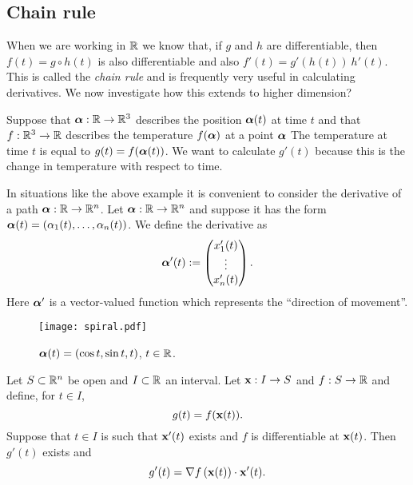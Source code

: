 \subsection*{Chain rule}

When we are working in \(\mathbb{R}\) we know that, if \(g\) and \(h\) are differentiable, then \(f(t) = g\circ h(t)\) is also differentiable and also \(f'(t) = g'(h(t)) \ h'(t)\).
This is called the \emph{chain rule} and is frequently very useful in calculating derivatives.
We now investigate how this extends to higher dimension?

\begin{example*}
    Suppose that
    \(\boldsymbol{\alpha}:\mathbb{R} \to \mathbb{R}^3\) describes the position \(\boldsymbol{\alpha}(t)\) at time \(t\)
    and that
    \(f:\mathbb{R}^3 \to \mathbb{R}\) describes the temperature \(f(\boldsymbol{\alpha})\) at a point \(\boldsymbol{\alpha}\)
    The temperature at time \(t\) is equal to \(g(t)=f(\boldsymbol{\alpha}(t))\).
    We want to calculate \(g'(t)\) because this is the change in temperature with respect to time.
\end{example*}

In situations like the above example it is convenient to consider the derivative of a path \(\boldsymbol{\alpha}:\mathbb{R} \to \mathbb{R}^n\).
Let \(\boldsymbol{\alpha}:\mathbb{R} \to \mathbb{R}^n\) and suppose it has the form
\(\boldsymbol{\alpha}(t) = \left( \alpha_1(t), \ldots, \alpha_n(t)  \right)\).
We define the derivative as
\[
    \boldsymbol{\alpha}'(t) := \begin{pmatrix}
        x_1'(t) \\
        \vdots  \\
        x_n'(t)
    \end{pmatrix}.
\]
\noindent
Here \(\boldsymbol{\alpha}'\) is a vector-valued function which represents the ``direction of movement''.

\begin{figure}[htb]
    \begin{center}
        \texttt{[image: spiral.pdf]}
        \caption{\(\boldsymbol{\alpha}(t)=(\cos t, \sin t, t)\), \(t\in \mathbb{R}\).}%
        \label{fig:spiral}
    \end{center}
\end{figure}


\begin{theorem*}
    Let \(S\subset \mathbb{R}^n\) be open and \(I\subset \mathbb{R}\) an interval.
    Let \(\mathbf{x}: I \to S\) and \(f:S \to \mathbb{R}\) and define, for \(t\in I\),
    \[
        g(t) = f (\mathbf{x}(t)).
    \]
    Suppose that  \(t\in I\) is such that \(\mathbf{x}'(t)\) exists and \(f\) is differentiable at \(\mathbf{x}(t)\).
    Then \(g'(t)\) exists and
    \[
        g'(t) = \nabla f \left(\mathbf{x}(t)\right) \cdot \mathbf{x}'(t).
    \]
\end{theorem*}


